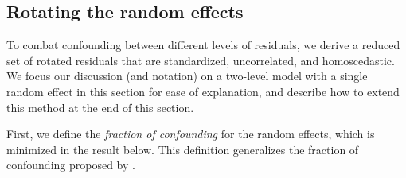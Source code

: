 \documentclass[12pt]{article} %
\newtheorem{definition}{Definition}
\newcommand{\trans}{\ensuremath{^\prime}}
\newcommand{\var}{\ensuremath{\mathrm{Var}}}
\begin{document}
\subsection{Rotating the random effects}\label{sec:rotate}

To combat  confounding between different  levels of residuals, we derive a reduced set of rotated residuals that are standardized, uncorrelated, and homoscedastic. We focus our discussion (and notation) on a two-level model with a single random effect in this section for ease of explanation, and describe how to extend this method at the end of this section.


First, we define the \emph{fraction of confounding} for the random effects, which is minimized in the result below. This definition generalizes the fraction of confounding proposed by \cite{HildenMinton:1995wh}. 

%


\end{document}
